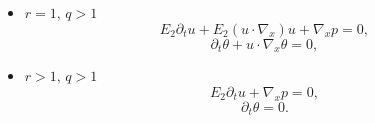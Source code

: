 \begin{theorem}
\begin{itemize}
\item $ r=1$, $q>1$ \begin{equation}E_2\partial_t u+ {E_{2}} (u\cdot \nabla_x) u +\nabla_x p= 0,\label{eq:incU12}\end{equation}
\begin{equation} 
 \partial_t \theta +  u\cdot \nabla_x\theta=0,\label{eq:incTH12}
\end{equation}
\item $r>1$, $q>1$ \begin{equation}
E_2\partial_t u+\nabla_x p= 0,\label{eq:incU22} \end{equation}
\begin{equation}
\partial_t \theta = 0.\label{eq:incTH22}
 \end{equation} 

\end{itemize}
 

\end{theorem}
